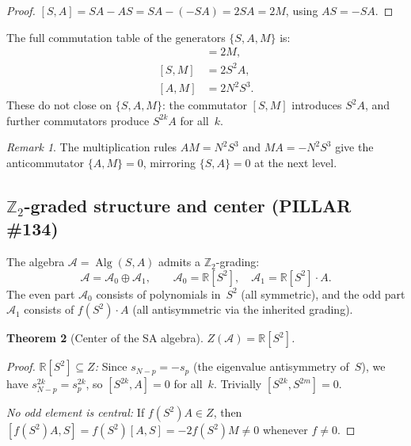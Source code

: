 \documentclass[aps,prd,twocolumn,superscriptaddress,floatfix,nofootinbib]{revtex4-2}
\newtheorem{theorem}{Theorem}
\theoremstyle{definition}
\theoremstyle{remark}
\newtheorem{remark}[theorem]{Remark}
\begin{document}
\begin{proof}
  $[S,A] = SA - AS = SA - (-SA) = 2SA = 2M$, using $AS = -SA$.
\end{proof}

The full commutation table of the generators $\{S, A, M\}$ is:
\begin{align}
  [S, A] &= 2M, \label{eq:sa-comm1} \\
  [S, M] &= 2S^2 A, \label{eq:sa-comm2} \\
  [A, M] &= 2N^2 S^3. \label{eq:sa-comm3}
\end{align}
These do not close on $\{S, A, M\}$: the commutator $[S,M]$ introduces
$S^2 A$, and further commutators produce $S^{2k}A$ for all~$k$.

\begin{remark}
  The multiplication rules $AM = N^2 S^3$ and $MA = -N^2 S^3$ give
  the anticommutator $\{A, M\} = 0$, mirroring $\{S, A\} = 0$ at the
  next level.
\end{remark}

\subsection{$\mathbb{Z}_2$-graded structure and center (PILLAR \#134)}
\label{ssec:sa-grading}

The algebra $\mathcal{A} = \operatorname{Alg}(S, A)$ admits a
$\mathbb{Z}_2$-grading:
\begin{equation}\label{eq:sa-grading}
  \mathcal{A} = \mathcal{A}_0 \oplus \mathcal{A}_1, \qquad
  \mathcal{A}_0 = \mathbb{R}[S^2], \quad
  \mathcal{A}_1 = \mathbb{R}[S^2] \cdot A.
\end{equation}
The even part $\mathcal{A}_0$ consists of polynomials in~$S^2$
(all symmetric), and the odd part $\mathcal{A}_1$ consists of
$f(S^2)\cdot A$ (all antisymmetric via the inherited grading).

\begin{theorem}[Center of the SA algebra]\label{thm:sa-center}
  $Z(\mathcal{A}) = \mathbb{R}[S^2]$.
\end{theorem}

\begin{proof}
  \emph{$\mathbb{R}[S^2] \subseteq Z$:} Since $s_{N-p} = -s_p$
  (the eigenvalue antisymmetry of~$S$), we have $s_{N-p}^{2k} = s_p^{2k}$,
  so $[S^{2k}, A] = 0$ for all~$k$. Trivially $[S^{2k}, S^{2m}] = 0$.

  \emph{No odd element is central:} If $f(S^2)A \in Z$, then
  $[f(S^2)A, S] = f(S^2)[A,S] = -2f(S^2)M \neq 0$ whenever $f \neq 0$.
\end{proof}
\end{document}
